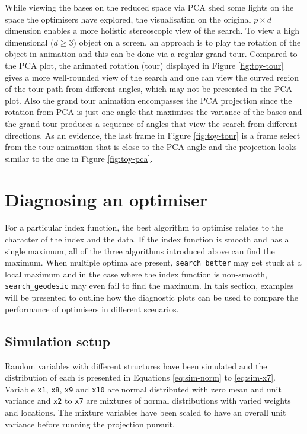 While viewing the bases on the reduced space via PCA shed some lights on
the space the optimisers have explored, the visualisation on the
original \(p \times d\) dimension enables a more holistic stereoscopic
view of the search. To view a high dimensional (\(d \ge 3\)) object on a
screen, an approach is to play the rotation of the object in animation
and this can be done via a regular grand tour. Compared to the PCA plot,
the animated rotation (tour) displayed in Figure \ref{fig:toy-tour}
gives a more well-rounded view of the search and one can view the curved
region of the tour path from different angles, which may not be
presented in the PCA plot. Also the grand tour animation encompasses the
PCA projection since the rotation from PCA is just one angle that
maximises the variance of the bases and the grand tour produces a
sequence of angles that view the search from different directions. As an
evidence, the last frame in Figure \ref{fig:toy-tour} is a frame select
from the tour animation that is close to the PCA angle and the
projection looks similar to the one in Figure \ref{fig:toy-pca}.

\hypertarget{application}{%
\section{Diagnosing an optimiser}\label{application}}

For a particular index function, the best algorithm to optimise relates
to the character of the index and the data. If the index function is
smooth and has a single maximum, all of the three algorithms introduced
above can find the maximum. When multiple optima are present,
\texttt{search\_better} may get stuck at a local maximum and in the case
where the index function is non-smooth, \texttt{search\_geodesic} may
even fail to find the maximum. In this section, examples will be
presented to outline how the diagnostic plots can be used to compare the
performance of optimisers in different scenarios.

\hypertarget{simulation-setup}{%
\subsection{Simulation setup}\label{simulation-setup}}

Random variables with different structures have been simulated and the
distribution of each is presented in Equations \ref{eq:sim-norm} to
\ref{eq:sim-x7}. Variable \texttt{x1}, \texttt{x8}, \texttt{x9} and
\texttt{x10} are normal distributed with zero mean and unit variance and
\texttt{x2} to \texttt{x7} are mixtures of normal distributions with
varied weights and locations. The mixture variables have been scaled to
have an overall unit variance before running the projection pursuit.

